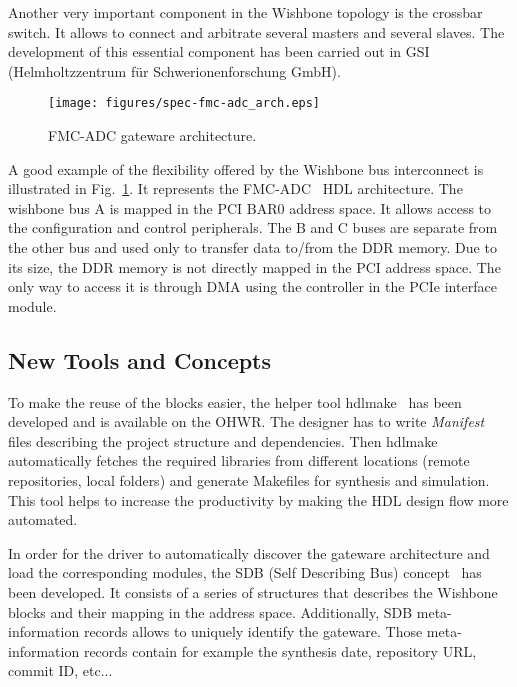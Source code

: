 \documentclass{JAC2003}
\begin{document}
Another very important component in the Wishbone topology is the crossbar switch.
It allows to connect and arbitrate several masters and several slaves.
The development of this essential component has been carried out in GSI (Helmholtzzentrum f\"ur Schwerionenforschung GmbH).

\begin{figure}[htb]
   \centering
   \texttt{[image: figures/spec-fmc-adc\_arch.eps]}
   \caption{FMC-ADC gateware architecture.}
   \label{spec-fmc-adc_arch}
\end{figure}

A good example of the flexibility offered by the Wishbone bus interconnect is illustrated in Fig.~\ref{spec-fmc-adc_arch}.
It represents the FMC-ADC~\cite{fmc-adc} HDL architecture.
The wishbone bus A is mapped in the PCI BAR0 address space.
It allows access to the configuration and control peripherals.
The B and C buses are separate from the other bus and used only to transfer data to/from the DDR memory.
Due to its size, the DDR memory is not directly mapped in the PCI address space.
The only way to access it is through DMA using the controller in the PCIe interface module.

\subsection{New Tools and Concepts}

To make the reuse of the blocks easier, the helper tool hdlmake~\cite{hdlmake} has been developed and is available on the OHWR.
The designer has to write \textit{Manifest} files describing the project structure and dependencies.
Then hdlmake automatically fetches the required libraries from different locations (remote repositories, local folders) and generate Makefiles for synthesis and simulation.
This tool helps to increase the productivity by making the HDL design flow more automated.

In order for the driver to automatically discover the gateware architecture and load the corresponding modules, the SDB (Self Describing Bus) concept~\cite{sdb} has been developed.
It consists of a series of structures that describes the Wishbone blocks and their mapping in the address space.
Additionally, SDB meta-information records allows to uniquely identify the gateware.
Those meta-information records contain for example the synthesis date, repository URL, commit ID, etc...
\end{document}
